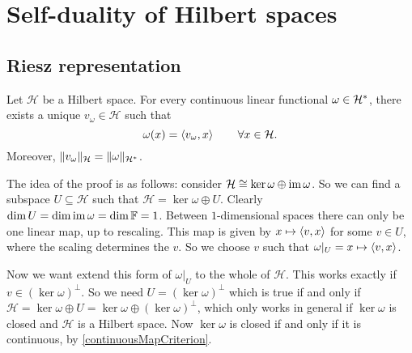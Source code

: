 \section{Self-duality of Hilbert spaces}
\subsection{Riesz representation}
\begin{theorem} \label{rieszRepresentation}
Let $\mathcal{H}$ be a Hilbert space. For every continuous linear functional $\omega\in {\mathcal{H}}^*$, there exists a unique $v_\omega\in\mathcal{H}$ such that
\[ \omega(x) = \left\langle v_\omega, x \right\rangle \qquad \forall x\in\mathcal{H}. \]
Moreover, $\lVert v_\omega\rVert_\mathcal{H} = \lVert\omega\rVert_{{\mathcal{H}}^*}$.
\end{theorem}  

The idea of the proof is as follows: consider $\mathcal{H} \cong \ker\omega \oplus \operatorname{im}\omega$. So we can find a subspace $U\subseteq \mathcal{H}$ such that $\mathcal{H} = \ker\omega\oplus U$. Clearly $\dim U = \dim\operatorname{im}\omega = \dim\mathbb{F} = 1$. Between $1$-dimensional spaces there can only be one linear map, up to rescaling. This map is given by $x\mapsto \left\langle v,x \right\rangle$ for some $v\in U$, where the scaling determines the $v$. So we choose $v$ such that $\omega|_U = x\mapsto \left\langle v,x \right\rangle$.

Now we want extend this form of $\omega|_U$ to the whole of $\mathcal{H}$. This works exactly if $v\in(\ker\omega)^\perp$. So we need $U=(\ker\omega)^\perp$ which is true if and only if $\mathcal{H} = \ker\omega\oplus U = \ker\omega\oplus (\ker\omega)^\perp$, which only works in general if $\ker\omega$ is closed and $\mathcal{H}$ is a Hilbert space. Now $\ker\omega$ is closed if and only if it is continuous, by \ref{continuousMapCriterion}.


